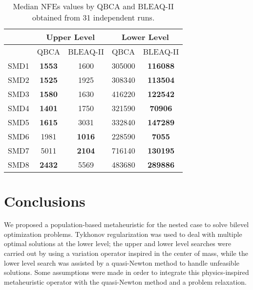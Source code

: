 \documentclass[conference]{IEEEtran}
\theoremstyle{definition}
\begin{document}
\begin{table}[t]
    \caption{Median NFEs values by QBCA and BLEAQ-II obtained from 31 independent runs.}
    \label{tab:ul-comparative-fes}
    \centering
    \begin{tabular}{|c|c|c|c|c|}
\hline
& \multicolumn{2}{c|}{Upper Level} & \multicolumn{2}{c|}{Lower Level} \\ \hline
& QBCA & BLEAQ-II & QBCA & BLEAQ-II \\ \hline
SMD1 & \textbf{1553}  & 1600          &  305000 & \textbf{116088} \\ \hline
SMD2 & \textbf{1525}  & 1925          &  308340 & \textbf{113504} \\ \hline
SMD3 & \textbf{1580}  & 1630          &  416220 & \textbf{122542} \\ \hline
SMD4 & \textbf{1401} & 1750  &  321590 & \textbf{70906} \\ \hline
SMD5 & \textbf{1615}  & 3031          &  332840 & \textbf{147289} \\ \hline
SMD6 & 1981 &  \textbf{1016} &   228590& \textbf{7055} \\ \hline
SMD7 & 5011 &  \textbf{2104} & 716140  & \textbf{130195} \\ \hline
SMD8 & \textbf{2432}  & 5569          &  483680 & \textbf{289886} \\ \hline
    \end{tabular}
\end{table}





\section{Conclusions} %
\label{sec:conclusions}


We proposed a population-based metaheuristic for the nested case to solve bilevel
optimization problems. Tykhonov regularization was used to deal with multiple
optimal solutions at the lower level; the upper and lower level searches were
carried out by using a variation operator inspired in the center of mass, while
the lower level search was assisted by a quasi-Newton method to handle unfeasible
solutions. Some assumptions were made in order to integrate this physics-inspired
metaheuristic operator with the quasi-Newton method and a problem relaxation.
\end{document}
